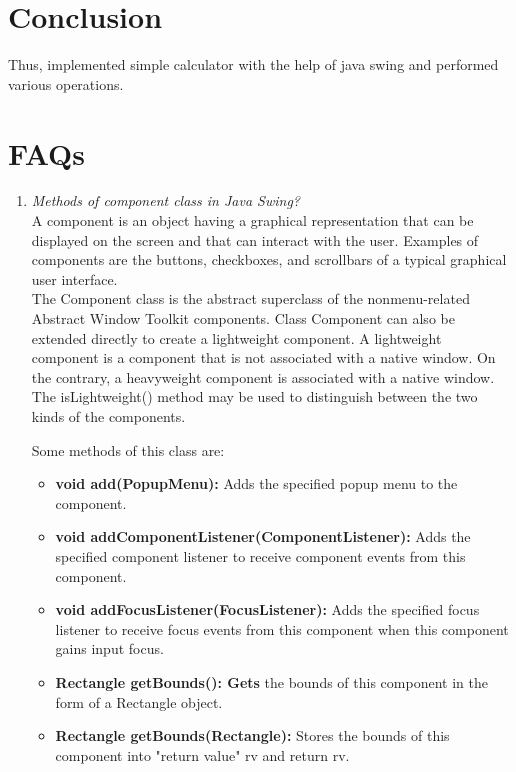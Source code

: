 \documentclass[11pt]{article}
\begin{document}
\section{Conclusion}
Thus, implemented simple calculator with the help of java swing and performed various
operations.


\section{FAQs}
\begin{enumerate}
	\item \textit{Methods of component class in Java Swing?}\\

	      A component is an object having a graphical representation that can be displayed on the screen and that can interact with the user. Examples of components are the buttons, checkboxes, and scrollbars of a typical graphical user interface.\\

	      The Component class is the abstract superclass of the nonmenu-related Abstract Window Toolkit components. Class Component can also be extended directly to create a lightweight component. A lightweight component is a component that is not associated with a native window. On the contrary, a heavyweight component is associated with a native window. The isLightweight() method may be used to distinguish between the two kinds of the components.

	      Some methods of this class are:
	      \begin{itemize}
		      \item \textbf{void add(PopupMenu):} Adds the specified popup menu to the component.
		      \item \textbf{void addComponentListener(ComponentListener):} Adds the specified component listener to receive component events from this component.
		      \item \textbf{void addFocusListener(FocusListener):} Adds the specified focus listener to receive focus events from this component when this component gains input focus.
		      \item \textbf{Rectangle getBounds(): Gets} the bounds of this component in the form of a Rectangle object.
		      \item \textbf{Rectangle getBounds(Rectangle):} Stores the bounds of this component into "return value" rv and return rv.
	      \end{itemize}


\end{enumerate}
\end{document}
